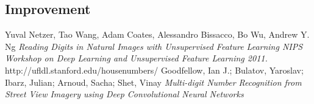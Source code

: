 \documentclass[12pt]{article}
\begin{document}
\subsection{Improvement}

\begin{thebibliography}{9}
Yuval Netzer, Tao Wang, Adam Coates, Alessandro Bissacco, Bo Wu, Andrew Y. Ng 
\textit{Reading Digits in Natural Images with Unsupervised Feature Learning NIPS Workshop on Deep Learning and Unsupervised Feature Learning 2011.}
http://ufldl.stanford.edu/housenumbers/
Goodfellow, Ian J.; Bulatov, Yaroslav; Ibarz, Julian; Arnoud, Sacha; Shet, Vinay
\textit{Multi-digit Number Recognition from Street View Imagery using Deep Convolutional Neural Networks}

\end{thebibliography}
	
\end{document}
